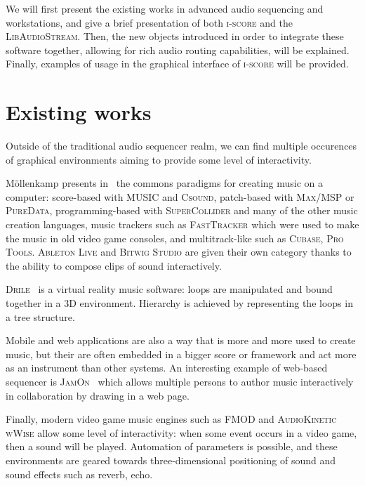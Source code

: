 \documentclass{article}
\newcommand*{\LibAudioStream}{\textsc{LibAudioStream}\xspace}
\newcommand*{\iscore}{\textsc{i-score}\xspace}
\newcommand*{\maxmsp}{\textsc{Max/MSP}\xspace}
\newcommand*{\puredata}{\textsc{PureData}\xspace}
\newcommand*{\csound}{\textsc{Csound}\xspace}
\newcommand*{\supercollider}{\textsc{SuperCollider}\xspace}
\newcommand*{\abletonlive}{\textsc{Ableton Live}\xspace}
\newcommand*{\bitwigstudio}{\textsc{Bitwig Studio}\xspace}
\newcommand*{\fasttracker}{\textsc{FastTracker}\xspace}
\newcommand*{\cubase}{\textsc{Cubase}\xspace}
\newcommand*{\protools}{\textsc{Pro Tools}\xspace}
\newcommand*{\MUSIC}{\textsc{MUSIC}\xspace}
\newcommand*{\drile}{\textsc{Drile}\xspace}
\newcommand*{\jamon}{\textsc{JamOn}\xspace}
\newcommand*{\wwise}{\textsc{AudioKinetic wWise}\xspace}
\newcommand*{\fmod}{\textsc{FMOD}\xspace}
\begin{document}
We will first present the existing works in advanced audio sequencing and workstations, 
and give a brief presentation of both \iscore and the \LibAudioStream.
Then, the new objects introduced in order to integrate these software together, allowing 
for rich audio routing capabilities, will be explained.
Finally, examples of usage in the graphical interface of \iscore will be provided.



\section{Existing works}
Outside of the traditional audio sequencer realm, we can find 
multiple occurences of graphical environments aiming to provide 
some level of interactivity.

M{\"o}llenkamp presents in~\cite{mollenkampparadigms} the 
commons paradigms for creating music on a computer: score-based with \MUSIC and \csound, 
patch-based with \maxmsp or \puredata, programming-based with \supercollider and many of the other music creation languages, music trackers such as \fasttracker which were used to make the music in old video game consoles, and multitrack-like such as \cubase, \protools.
\abletonlive and \bitwigstudio are given their own category thanks to the ability to compose clips of sound interactively.

\drile~\cite{berthaut2010drile} is a virtual reality music software: loops are manipulated and bound together in a 3D environment. Hierarchy is achieved by representing the loops in a tree structure.

Mobile and web applications are also a way that is more and more used to create music, 
but their are often embedded in a bigger score or framework and act more as an instrument than other systems.
An interesting example of web-based sequencer is \jamon~\cite{rosselet2013jam} which allows multiple persons to author music interactively in collaboration by drawing in a web page.

Finally, modern video game music engines such as \fmod and \wwise allow some level of interactivity: when some event occurs in a video game, then a sound will be played. 
Automation of parameters is possible, and these environments are geared towards three-dimensional positioning of sound and sound effects such as reverb, echo.
\end{document}
